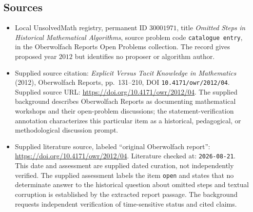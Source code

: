 \documentclass[11pt]{article}
\begin{document}
\subsection{Sources}
\begin{itemize}
\item Local UnsolvedMath registry, permanent ID \(30001971\), title \emph{Omitted Steps in Historical Mathematical Algorithms}, source problem code \texttt{catalogue entry}, in the Oberwolfach Reports Open Problems collection. The record gives proposed year \(2012\) but identifies no proposer or algorithm author.
\item Supplied source citation: \emph{Explicit Versus Tacit Knowledge in Mathematics} (2012), Oberwolfach Reports, pp.~131--210, DOI \texttt{10.4171/owr/2012/04}. Supplied source URL: \url{https://doi.org/10.4171/owr/2012/04}. The supplied background describes Oberwolfach Reports as documenting mathematical workshops and their open-problem discussions; the statement-verification annotation characterizes this particular item as a historical, pedagogical, or methodological discussion prompt.
\item Supplied literature source, labeled ``original Oberwolfach report'': \url{https://doi.org/10.4171/owr/2012/04}. Literature checked at: \texttt{2026-08-21}. This date and assessment are supplied dated curation, not independently verified. The supplied assessment labels the item \texttt{open} and states that no determinate answer to the historical question about omitted steps and textual corruption is established by the extracted report passage. The background requests independent verification of time-sensitive status and cited claims.
\end{itemize}
\end{document}
